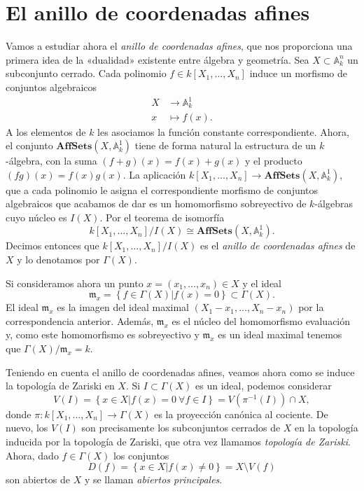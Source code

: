\documentclass[12pt,a4paper]{article}
\theoremstyle{definition} \newtheorem{defn}[thm]{Definición}
\theoremstyle{definition} \newtheorem{ejemplo}[thm]{Ejemplo}
\theoremstyle{definition} \newtheorem{ejercicio}[thm]{Ejercicio}
\theoremstyle{remark} \newtheorem*{obs}{Observación}
\def\AA{\mathbb{A}}
\def\mm{\mathfrak{m}}
\begin{document}
  \section{El anillo de coordenadas afines}
   Vamos a estudiar ahora el \emph{anillo de coordenadas afines}, que nos proporciona una primera idea de la «dualidad» existente entre álgebra y geometría. Sea $X\subset \AA^n_k$ un subconjunto cerrado. Cada polinomio $f\in k[X_1,\dots,X_n]$ induce un morfismo de conjuntos algebraicos
  \begin{align*}
     X&\longrightarrow \AA^1_k\\ 
      x &\longmapsto f(x). 
    \end{align*} 
    A los elementos de $k$ les asociamos la función constante correspondiente. 
    Ahora, el conjunto $\mathbf{AffSets}(X,\AA^1_k)$ tiene de forma natural la estructura de un $k$-álgebra, con la suma $(f+g)(x)=f(x)+g(x)$ y el producto $(fg)(x)=f(x)g(x)$. La aplicación $k[X_1,\dots,X_n]\rightarrow \mathbf{AffSets}(X,\AA^1_k)$, que a cada polinomio le asigna el correspondiente morfismo de conjuntos algebraicos que acabamos de dar es un homomorfismo sobreyectivo de $k$-álgebras cuyo núcleo es $I(X)$. Por el teorema de isomorfía
    \begin{equation*}
      k[X_1,\dots,X_n]/I(X) \cong \mathbf{AffSets}(X,\AA^1_k).
    \end{equation*}
    Decimos entonces que $k[X_1,\dots,X_n]/I(X)$ es el \emph{anillo de coordenadas afines} de $X$ y lo denotamos por $\Gamma(X)$.
      
    Si consideramos ahora un punto $x=(x_1,\dots,x_n)\in X$ y el ideal
    \begin{equation*}
      \mm_x=\left\{ f\in \Gamma(X) | f(x)=0 \right\}\subset \Gamma(X).
    \end{equation*}
    El ideal $\mm_x$ es la imagen del ideal maximal $(X_1-x_1,\dots,X_n-x_n)$ por la correspondencia anterior. Además, $\mm_x$ es el núcleo del homomorfismo evaluación y, como este homomorfismo es sobreyectivo y $\mm_x$ es un ideal maximal tenemos que $\Gamma(X)/\mm_x=k$.

    Teniendo en cuenta el anillo de coordenadas afines, veamos ahora como se induce la topología de Zariski en $X$. Si $I\subset \Gamma(X)$ es un ideal, podemos considerar
    \begin{equation*}
      V(I)=\left\{ x\in X| f(x)=0 \ \forall f\in I \right\}=V(\pi^{-1}(I))\cap X,
    \end{equation*}
    donde $\pi:k[X_1,\dots,X_n]\rightarrow \Gamma(X)$ es la proyección canónica al cociente. De nuevo, los $V(I)$ son precisamente los subconjuntos cerrados de $X$ en la topología inducida por la topología de Zariski, que otra vez llamamos \emph{topología de Zariski}. Ahora, dado $f\in \Gamma(X)$ los conjuntos 
    \begin{equation*}
      D(f)=\left\{ x\in X|f(x)\neq 0 \right\}=X\setminus V(f)
    \end{equation*}
    son abiertos de $X$ y se llaman \emph{abiertos principales}.
\end{document}
